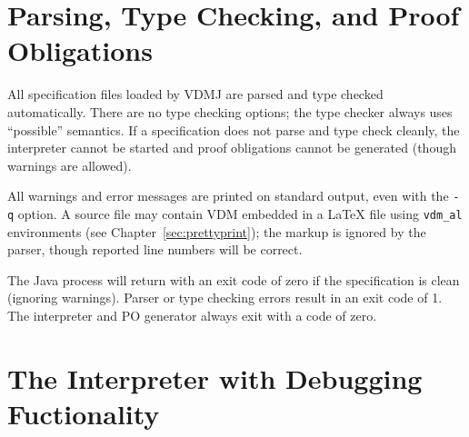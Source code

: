 \documentclass{overturerepchap}
\begin{document}



\section{Parsing, Type Checking, and Proof Obligations}

All specification files loaded by VDMJ are parsed and type checked
automatically. There are no type checking options; the type checker
always uses ``possible'' semantics. If a specification does not parse
and type check cleanly, the interpreter cannot be started and proof
obligations cannot be generated (though warnings are allowed).

All warnings and error messages are printed on standard output, even
with the \texttt{-q} option.  A source file may contain VDM embedded
in a LaTeX file using \verb|vdm_al| environments (see
Chapter~\ref{sec:prettyprint}); the markup is ignored by the parser,
though reported line numbers will be correct.

The Java process will return with an exit code of zero if the
specification is clean (ignoring warnings).  Parser or type checking
errors result in an exit code of 1. The interpreter and PO generator
always exit with a code of zero.

\section{The Interpreter with Debugging Fuctionality}
\end{document}
